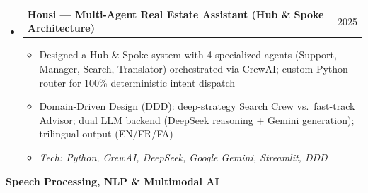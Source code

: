 \documentclass[11pt,a4paper]{article}
\makeatletter
\newcommand{\subspace}{\vspace{0.5em}}
\newcommand{\cvsubsection}[1]{
    \subspace
    \noindent\textcolor{primary}{\large \textbf{#1}}
    \par\vspace{0.3em}
}
\newcommand{\headerrow}[2]{
    \begin{tabular*}{\linewidth}{l@{\extracolsep{\fill}}r}
    #1 & \textcolor{primary}{#2} \\
    \end{tabular*}
}
\makeatother
\begin{document}
\begin{itemize}[leftmargin=1em, label={}]
    \subspace
    \item
    \headerrow{\textbf{Housi — Multi-Agent Real Estate Assistant (Hub \& Spoke Architecture)}}{2025}
    \begin{itemize}[leftmargin=1.5em, label=$\bullet$, nosep]
        \item Designed a Hub \& Spoke system with 4 specialized agents (Support, Manager, Search, Translator) orchestrated via CrewAI; custom Python router for 100\% deterministic intent dispatch
        \item Domain-Driven Design (DDD): deep-strategy Search Crew vs.\ fast-track Advisor; dual LLM backend (DeepSeek reasoning + Gemini generation); trilingual output (EN/FR/FA)
        \item \emph{Tech: Python, CrewAI, DeepSeek, Google Gemini, Streamlit, DDD}
    \end{itemize}

\end{itemize}

\clearpage

\cvsubsection{Speech Processing, NLP \& Multimodal AI}
\end{document}
